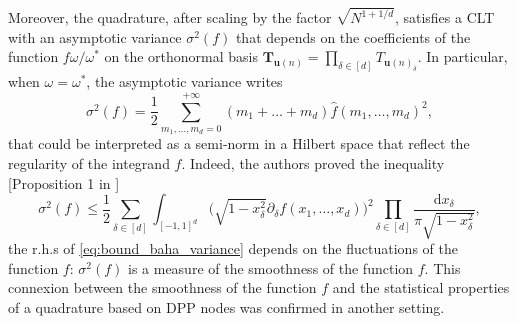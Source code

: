 \documentclass[twoside,11pt]{book}
\newtheorem{theorem}{Theorem}
\numberwithin{theorem}{chapter}
\numberwithin{definition}{chapter}
\numberwithin{proposition}{chapter}
\numberwithin{corollary}{chapter}
\numberwithin{example}{chapter}
\numberwithin{lemma}{chapter}
\begin{document}
 Moreover, the quadrature, after scaling by the factor $\sqrt{N^{1+1/d}}$, satisfies a CLT with an asymptotic variance $\sigma^{2}(f)$ that depends on the coefficients of the function $\displaystyle f \omega / \omega^{*}$ on the orthonormal basis $\bm{T}_{\bm{u}(n)} = \prod\limits_{ \delta \in [d]} T_{\bm{u}(n)_{\delta}}$. In particular, when $\omega = \omega^{*}$, the asymptotic variance writes
\begin{equation}
\sigma^{2}(f) = \frac{1}{2} \sum\limits_{m_{1}, \dots , m_{d} = 0}^{+\infty} (m_{1}+\dots +m_{d}) \widehat{f} (m_{1}, \dots, m_{d})^{2},
\end{equation}
that could be interpreted as a semi-norm in a Hilbert space that reflect the regularity of the integrand $f$. Indeed, the authors proved the inequality [Proposition 1 in \citep{BaHa16}]
\begin{equation}\label{eq:bound_baha_variance}
\sigma^{2}(f) \leq \frac{1}{2} \sum\limits_{\delta \in [d]} \int_{[-1,1]^{d}} \bigg(\sqrt{1-x_{\delta}^{2}} \partial_{\delta}f(x_{1}, \dots,x_{d}) \bigg)^{2} \prod\limits_{\delta \in [d]} \frac{\mathrm{d}x_{\delta}}{\pi \sqrt{1-x_{\delta}^{2}}},
\end{equation}
the r.h.s of \eqref{eq:bound_baha_variance} depends on the fluctuations of the function $f$: $\sigma^{2}(f)$ is a measure of the smoothness of the function $f$. This connexion between the smoothness of the function $f$ and the statistical properties of a quadrature based on DPP nodes was confirmed in another setting.









\end{document}
